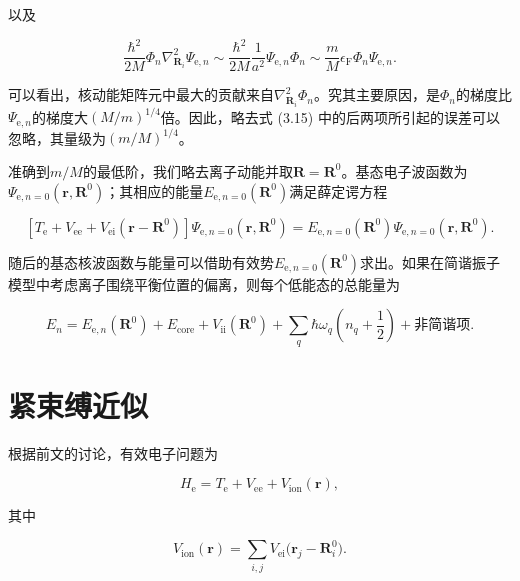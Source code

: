 以及

\begin{equation*}
\frac{\hbar^2}{2M}\Phi_n\nabla_{\mathbf R_i}^2\Psi_{\mathrm e,n} \sim \frac{\hbar^2}{2M}\frac{1}{a^2}\Psi_{\mathrm e,n}\Phi_n \sim \frac{m}{M}\epsilon_{\mathrm F}\Phi_n\Psi_{\mathrm e,n}.
\tag{3.21}
\end{equation*}

可以看出，核动能矩阵元中最大的贡献来自$\nabla_{\mathbf R_i}^2\Phi_n$。究其主要原因，是$\Phi_n$的梯度比$\Psi_{\mathrm e,n}$的梯度大$(M/m)^{1/4}$倍。因此，略去式 (3.15) 中的后两项所引起的误差可以忽略，其量级为$(m/M)^{1/4}$。

准确到$m/M$的最低阶，我们略去离子动能并取$\mathbf R=\mathbf R^0$。基态电子波函数为$\Psi_{\mathrm e,n=0}(\mathbf r,\mathbf R^0)$；其相应的能量$E_{\mathrm e,n=0}(\mathbf R^0)$满足薛定谔方程

\begin{equation*}
\left[T_{\mathrm e} + V_{\mathrm{ee}} + V_{\mathrm{ei}}(\mathbf r-\mathbf R^0)\right]\Psi_{\mathrm e,n=0}(\mathbf r,\mathbf R^0) = E_{\mathrm e,n=0}(\mathbf R^0)\Psi_{\mathrm e,n=0}(\mathbf r,\mathbf R^0).
\tag{3.22}
\end{equation*}

随后的基态核波函数与能量可以借助有效势$E_{\mathrm e,n=0}(\mathbf R^0)$求出。如果在简谐振子模型中考虑离子围绕平衡位置的偏离，则每个低能态的总能量为

\begin{equation*}
E_n = E_{\mathrm e,n}(\mathbf R^0) + E_{\mathrm{core}} + V_{\mathrm{ii}}(\mathbf R^0) + \sum_q \hbar\omega_q\left(n_q + \frac{1}{2}\right) + \text{非简谐项}.
\tag{3.23}
\end{equation*}

\section{紧束缚近似}

根据前文的讨论，有效电子问题为

\begin{equation*}
H_{\mathrm e} = T_{\mathrm e} + V_{\mathrm{ee}} + V_{\mathrm{ion}}(\mathbf r),
\tag{3.24}
\end{equation*}

其中

\begin{equation*}
V_{\mathrm{ion}}(\mathbf r) = \sum_{i,j} V_{\mathrm{ei}}\big(\mathbf r_j - \mathbf R_i^0\big).
\tag{3.25}
\end{equation*}

